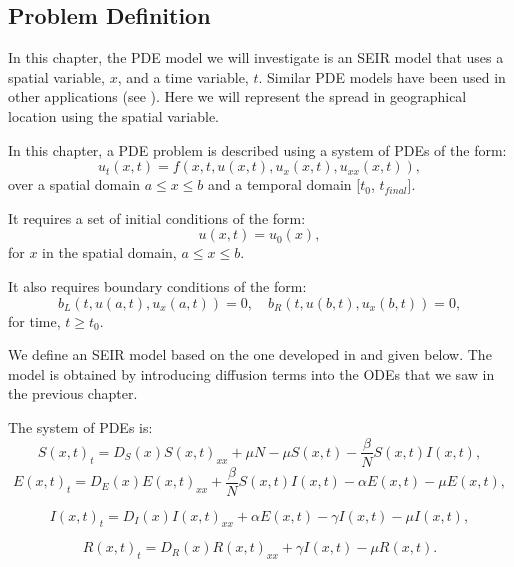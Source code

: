 \subsection{Problem Definition}
\label{subsection:pde_problem_def}
In this chapter, the PDE model we will investigate is an SEIR model that uses a spatial variable, $x$, and a time variable, $t$. Similar PDE models have been used in other applications (see \cite{MR3406651}). Here we will represent the spread in geographical location using the spatial variable.

In this chapter, a PDE problem is described using a system of PDEs of the form:
\begin{equation}
u_t(x, t) = f(x, t, u(x,t), u_x(x,t), u_{xx}(x,t)),
\end{equation} 
over a spatial domain ${a \leq x \leq b}$ and a temporal domain [${t_0}$, $t_{final}$]. 

It requires a set of initial conditions of the form:
\begin{equation}
u(x, t) = u_0(x),
\end{equation}
for $x$ in the spatial domain, ${a \leq x \leq b}$.

It also requires boundary conditions of the form:
\begin{equation}
b_L(t, u(a,t), u_x(a,t)) = 0, \quad b_R(t, u(b,t), u_x(b,t)) = 0,
\end{equation} 
for time, $t \geq t_0$.

We define an SEIR model based on the one developed in \cite{pdeModel} and given below. The model is obtained by introducing diffusion terms into the ODEs that we saw in the previous chapter.

The system of PDEs is:
\begin{equation}
S(x, t)_t = D_S(x)S(x, t)_{xx} + \mu N - \mu S(x, t) - \frac{\beta}{N}S(x, t)I(x, t),
\end{equation}
\begin{equation}
E(x, t)_t = D_E(x)E(x, t)_{xx} + \frac{\beta}{N}S(x, t)I(x, t) - \alpha E(x, t) - \mu E(x, t),
\end{equation}

\begin{equation}
I(x, t)_t = D_I(x)I(x, t)_{xx} + \alpha E(x, t) - \gamma I(x, t) - \mu I(x, t),
\end{equation}

\begin{equation}
R(x, t)_t = D_R(x)R(x, t)_{xx} + \gamma I(x, t) - \mu R(x, t).
\end{equation} 

